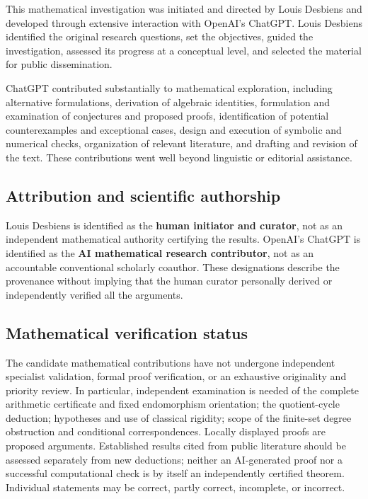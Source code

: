 \documentclass[
  11pt,
  a4paper,
]{article}
\begin{document}
This mathematical investigation was initiated and directed by Louis
Desbiens and developed through extensive interaction with OpenAI's
ChatGPT. Louis Desbiens identified the original research questions, set
the objectives, guided the investigation, assessed its progress at a
conceptual level, and selected the material for public dissemination.

ChatGPT contributed substantially to mathematical exploration, including
alternative formulations, derivation of algebraic identities,
formulation and examination of conjectures and proposed proofs,
identification of potential counterexamples and exceptional cases,
design and execution of symbolic and numerical checks, organization of
relevant literature, and drafting and revision of the text. These
contributions went well beyond linguistic or editorial assistance.

\subsection{Attribution and scientific
authorship}\label{attribution-and-scientific-authorship}

Louis Desbiens is identified as the \textbf{human initiator and
curator}, not as an independent mathematical authority certifying the
results. OpenAI's ChatGPT is identified as the \textbf{AI mathematical
research contributor}, not as an accountable conventional scholarly
coauthor. These designations describe the provenance without implying
that the human curator personally derived or independently verified all
the arguments.

\subsection{Mathematical verification
status}\label{mathematical-verification-status}

The candidate mathematical contributions have not undergone independent
specialist validation, formal proof verification, or an exhaustive
originality and priority review. In particular, independent examination
is needed of the complete arithmetic certificate and fixed endomorphism
orientation; the quotient-cycle deduction; hypotheses and use of
classical rigidity; scope of the finite-set degree obstruction and
conditional correspondences. Locally displayed proofs are proposed
arguments. Established results cited from public literature should be
assessed separately from new deductions; neither an AI-generated proof
nor a successful computational check is by itself an independently
certified theorem. Individual statements may be correct, partly correct,
incomplete, or incorrect.
\end{document}
